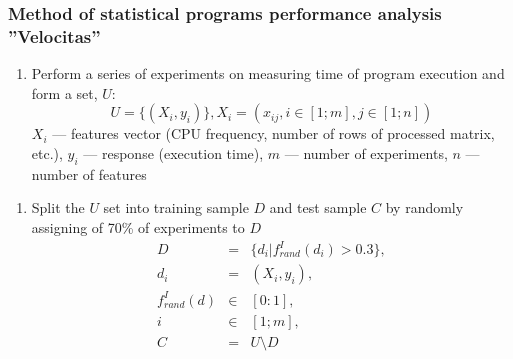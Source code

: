 \documentclass{beamer}
\newcounter{saveenumi}
\newcommand{\seti}{\setcounter{saveenumi}{\value{enumi}}}
\newcommand{\conti}{\setcounter{enumi}{\value{saveenumi}}}
\begin{document}
\begin{frame}
\frametitle{Method of statistical programs performance analysis ''Velocitas''}

	\begin{enumerate}
		\item Perform a series of experiments on measuring time of program execution and form a set, $U$:
			\begin{equation*}
				U = \{ ( X_i, y_i ) \}, X_i = (x_{ij}, i \in [1;m], j \in [1;n])
			\end{equation*}
		$X_i$ --- features vector (CPU frequency, number of rows of processed matrix, etc.), $y_i$ --- response (execution time), $m$ --- number of experiments, $n$ --- number of features
		\seti
	\end{enumerate}

\end{frame}

\begin{frame}
	\begin{enumerate}
		\conti
		\item Split the $U$ set into training sample $D$ and test sample $C$ by randomly assigning of 70\% of experiments to $D$
			\begin{eqnarray*}
				D &=& \{d_i | f_{rand}^I(d_i) > 0.3\}, \\
				d_i &=& (X_i, y_i), \\
				f_{rand}^I(d) &\in & [0:1], \\
				i &\in & [1;m], \\
				C &=& U \setminus D
			\end{eqnarray*}
		\seti
	\end{enumerate}
\end{frame}
\end{document}
